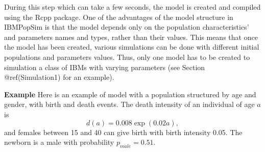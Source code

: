 During this step which can take a few seconds, the model is created and compiled using the Rcpp package.
One of the advantages of the model structure in IBMPopSim is that the model depends only on the population characteristics' and parameters names and types, rather than their values.
This means that once the model has been created, various simulations can be done with different initial populations and parameters values. Thus, only one model has to be created to simulation a class of IBMs with varying parameters (see Section @ref(Simulation1) for an example).

\textbf{Example} Here is an example of model with a population structured by age and gender, with birth and death events. The death intensity of an individual of age \(a\) is
\[d(a) = 0.008 \exp(0.02a),\]
and females between 15 and 40 can give birth with birth intensity 0.05. The newborn is a male with probability \(p_{male}= 0.51\).

